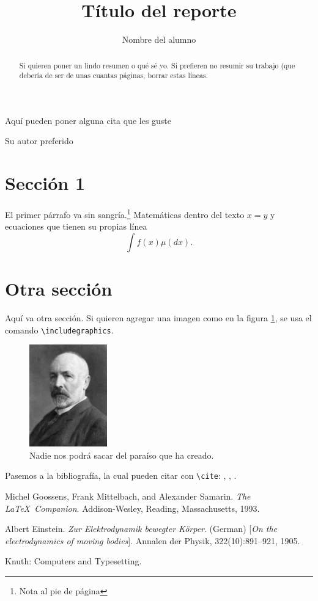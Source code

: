 \documentclass[
letterpaper,
11pt,
oneside,
twocolumn, %
article
]{memoir}
\title{Título del reporte} %
\author{Nombre del alumno} %
\begin{document}
\thispagestyle{empty}
\maketitle

\begin{abstract}
    Si quieren poner un lindo resumen o qué sé yo. Si prefieren no resumir su trabajo (que debería de ser de unas cuantas páginas, borrar estas líneas.
\end{abstract}

\epigraph{Aquí pueden poner alguna cita que les guste}{Su autor preferido}

\section*{Sección 1}

\noindent El primer párrafo va sin sangría.\footnote{Nota al pie de página} Matemáticas dentro del texto $x = y$ y ecuaciones que tienen su propias línea \[\int f (x) \mu(d x).\] 

\lipsum[1-6]

\section*{Otra sección}

\noindent Aquí va otra sección. Si quieren agregar una imagen como en la figura \ref{Figura}, se usa el comando \texttt{\textbackslash{}includegraphics}.

\begin{figure}[ht]
    \centering
    \includegraphics[width=0.3\textwidth,keepaspectratio]{Cantor}
    \caption{Nadie nos podrá sacar del paraíso que ha creado.}
    \label{Figura}
\end{figure}

Pasemos a la bibliografía, la cual pueden citar con \texttt{\textbackslash{}cite}: \cite{latexcompanion}, \cite{einstein}, \cite{knuthwebsite}.

\begin{thebibliography}{9}
Michel Goossens, Frank Mittelbach, and Alexander Samarin. 
\textit{The \LaTeX\ Companion}. 
Addison-Wesley, Reading, Massachusetts, 1993.
 
Albert Einstein. 
\textit{Zur Elektrodynamik bewegter K{\"o}rper}. (German) 
[\textit{On the electrodynamics of moving bodies}]. 
Annalen der Physik, 322(10):891–921, 1905.
 
Knuth: Computers and Typesetting.
\end{thebibliography}
\end{document}
